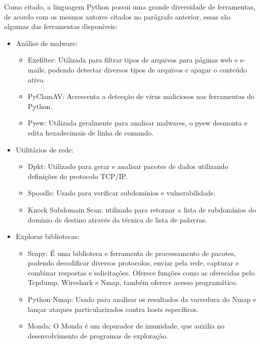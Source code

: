         Como citado, a linguagem Python possui uma grande diversidade de ferramentas, de acordo com os mesmos autores citados no parágrafo anterior, essas são algumas das ferramentas disponíveis:
        \begin{itemize}
        \item Análise de malware:
        	\begin{itemize}
        		\item Exefilter: Utilizada para filtrar tipos de arquivos para páginas web e e-mails, podendo detectar diversos tipos de arquivos e apagar o conteúdo ativo.
        		
        		\item PyClamAV: Acrescenta a detecção de vírus maliciosos nas ferramentas do Python.
        		
        		\item Pyew: Utilizada geralmente para analisar malwares, o pyew desmonta e edita hexadecimais de linha de comando.
        	\end{itemize}
        
        \item Utilitários de rede:
        	\begin{itemize}
        		\item Dpkt: Utilizado para gerar e analisar pacotes de dados utilizando definições do protocolo TCP/IP.
        		\item Spoodle: Usado para verificar subdomínios e vulnerabilidade.
        		\item Knock Subdomain Scan: utilizado para retornar a lista de subdomínios do domínio de destino através da técnica de lista de palavras.
        	\end{itemize}
        
        \item Explorar bibliotecas:
        	\begin{itemize}
        		\item Scapy: É uma biblioteca e ferramenta de processamento de pacotes, podendo decodificar diversos protocolos, enviar pela rede, capturar e combinar respostas e solicitações. Oferece funções como as oferecidas pelo Tcpdump, Wireshark e Nmap, também oferece acesso programático.
        		
        		\item Python Nmap: Usado para analisar os resultados da varredura do Nmap e lançar ataques particularizados contra hosts específicos.
        		
        		\item Monda: O Monda é um depurador de imunidade, que auxilia no desenvolvimento de programas de exploração.
        		

\end{itemize}
\end{itemize}
